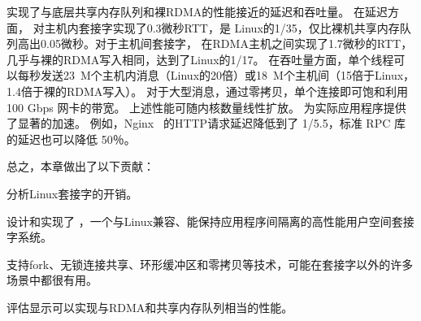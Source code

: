 
\sys {}实现了与底层共享内存队列和裸RDMA的性能接近的延迟和吞吐量。
在延迟方面，\sys {} 对主机内套接字实现了0.3微秒RTT，是 Linux的1/35，仅比裸机共享内存队列高出0.05微秒。对于主机间套接字，\sys {} 在RDMA主机之间实现了1.7微秒的RTT，几乎与裸的RDMA写入相同，达到了Linux的1/17。
在吞吐量方面，单个线程可以每秒发送23~M个主机内消息（Linux的20倍）或18~M个主机间（15倍于Linux，1.4倍于裸的RDMA写入）。
对于大型消息，通过零拷贝，单个连接即可饱和利用 100 Gbps 网卡的带宽。
上述性能可随内核数量线性扩放。
\sys {} 为实际应用程序提供了显著的加速。
例如，Nginx~ \cite {nginx} 的HTTP请求延迟降低到了 1/5.5，标准 RPC 库的延迟也可以降低 50％。

总之，本章做出了以下贡献：
\begin{ecompact}
\item 分析Linux套接字的开销。
\item 设计和实现了 \sys {}，一个与Linux兼容、能保持应用程序间隔离的高性能用户空间套接字系统。
\item 支持fork、无锁连接共享、环形缓冲区和零拷贝等技术，可能在套接字以外的许多场景中都很有用。
\item 评估显示\sys {}可以实现与RDMA和共享内存队列相当的性能。
\end{ecompact}


